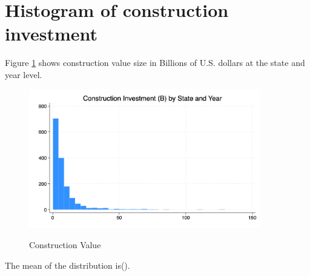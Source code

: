 \documentclass[12pt]{article}
\begin{document}
\section{Histogram of construction investment}
Figure \ref{fig:hist1} shows construction value size in Billions of U.S. dollars at the state and year level.
\vspace*{\baselineskip}

\begin{figure}[hp]
    \centering
    \caption{Construction Value} 
    \includegraphics[width=0.9\textwidth]{histinv.jpg}
    \label{fig:hist1}
\end{figure}
    \begin{center} \vspace*{-\baselineskip}
        \footnotesize {}
    \end{center}


The mean of the distribution is\MeanValue (\SD).
\end{document}
